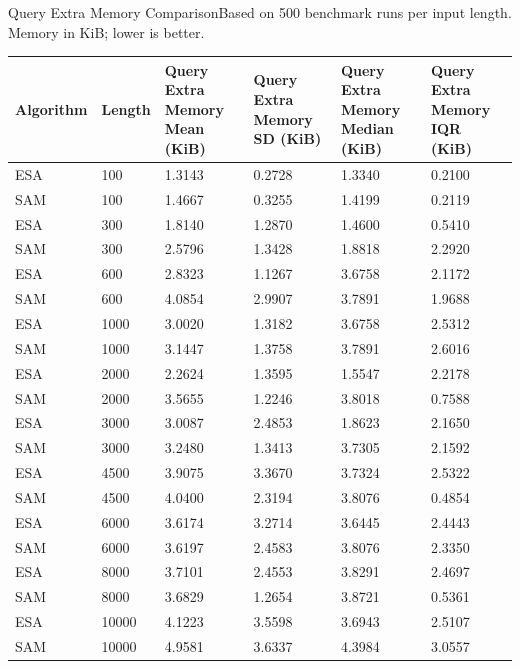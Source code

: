 \begin{benchmarktable}{Query Extra Memory Comparison}{Based on 500 benchmark runs per input length. Memory in KiB; lower is better.}
\begin{tabularx}{\textwidth}{|X|X|X|X|X|X|}
\toprule
Algorithm & Length & Query Extra Memory Mean (KiB) & Query Extra Memory SD (KiB) & Query Extra Memory Median (KiB) & Query Extra Memory IQR (KiB) \\
\midrule
ESA & 100 & 1.3143 & 0.2728 & 1.3340 & 0.2100 \\
SAM & 100 & 1.4667 & 0.3255 & 1.4199 & 0.2119 \\
\hline
ESA & 300 & 1.8140 & 1.2870 & 1.4600 & 0.5410 \\
SAM & 300 & 2.5796 & 1.3428 & 1.8818 & 2.2920 \\
\hline
ESA & 600 & 2.8323 & 1.1267 & 3.6758 & 2.1172 \\
SAM & 600 & 4.0854 & 2.9907 & 3.7891 & 1.9688 \\
\hline
ESA & 1000 & 3.0020 & 1.3182 & 3.6758 & 2.5312 \\
SAM & 1000 & 3.1447 & 1.3758 & 3.7891 & 2.6016 \\
\hline
ESA & 2000 & 2.2624 & 1.3595 & 1.5547 & 2.2178 \\
SAM & 2000 & 3.5655 & 1.2246 & 3.8018 & 0.7588 \\
\hline
ESA & 3000 & 3.0087 & 2.4853 & 1.8623 & 2.1650 \\
SAM & 3000 & 3.2480 & 1.3413 & 3.7305 & 2.1592 \\
\hline
ESA & 4500 & 3.9075 & 3.3670 & 3.7324 & 2.5322 \\
SAM & 4500 & 4.0400 & 2.3194 & 3.8076 & 0.4854 \\
\hline
ESA & 6000 & 3.6174 & 3.2714 & 3.6445 & 2.4443 \\
SAM & 6000 & 3.6197 & 2.4583 & 3.8076 & 2.3350 \\
\hline
ESA & 8000 & 3.7101 & 2.4553 & 3.8291 & 2.4697 \\
SAM & 8000 & 3.6829 & 1.2654 & 3.8721 & 0.5361 \\
\hline
ESA & 10000 & 4.1223 & 3.5598 & 3.6943 & 2.5107 \\
SAM & 10000 & 4.9581 & 3.6337 & 4.3984 & 3.0557 \\
\bottomrule
\end{tabularx}
\end{benchmarktable}

